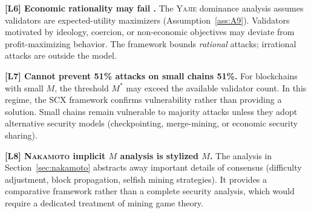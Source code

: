 \documentclass[11pt,a4paper]{article}
\theoremstyle{definition}
\newcommand{\Yajie}{\textsc{Yajie}}
\newcommand{\SCX}{\textsc{SCX}}
\newcommand{\mthreshold}{M^{*}}
\newcommand{\Nakamoto}{\textsc{Nakamoto}}
\newcommand{\PoW}{\mathrm{PoW}}
\newcommand{\limitationTag}[1]{\textsf{\textbf{[L#1]}}}
\begin{document}
\begin{enumerate}[label=\limitationTag{\arabic*},leftmargin=*]
    \item \textbf{\limitationTag{6} Economic rationality may fail .} The \Yajie{} dominance analysis assumes validators are expected-utility maximizers (Assumption~\ref{ass:A9}). Validators motivated by ideology, coercion, or non-economic objectives may deviate from profit-maximizing behavior. The framework bounds \textit{rational} attacks; irrational attacks are outside the model.
    \item \textbf{\limitationTag{7} Cannot prevent 51\% attacks on small chains 51\%.} For blockchains with small $M$, the threshold $\mthreshold$ may exceed the available validator count. In this regime, the \SCX{} framework confirms vulnerability rather than providing a solution. Small chains remain vulnerable to majority attacks unless they adopt alternative security models (checkpointing, merge-mining, or economic security sharing).
    \item \textbf{\limitationTag{8} \Nakamoto{} implicit $M$ analysis is stylized $M$.} The analysis in Section~\ref{sec:nakamoto} abstracts away important details of \PoW{} consensus (difficulty adjustment, block propagation, selfish mining strategies). It provides a comparative framework rather than a complete \PoW{} security analysis, which would require a dedicated treatment of mining game theory.
\end{enumerate}
\end{document}
